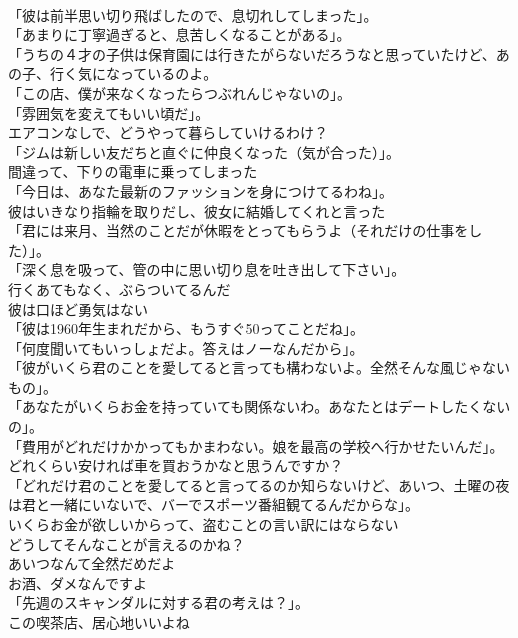 \documentclass[8pt]{extreport}
\begin{document}
\begin{CJK}{UTF8}{min}
\\	「彼は前半思い切り飛ばしたので、息切れしてしまった」。	
\\	「あまりに丁寧過ぎると、息苦しくなることがある」。	
\\	「うちの４才の子供は保育園には行きたがらないだろうなと思っていたけど、あの子、行く気になっているのよ。
\\	「この店、僕が来なくなったらつぶれんじゃないの」。	
\\	「雰囲気を変えてもいい頃だ」。	
\\	エアコンなしで、どうやって暮らしていけるわけ？	
\\	「ジムは新しい友だちと直ぐに仲良くなった（気が合った）」。	
\\	間違って、下りの電車に乗ってしまった	
\\	「今日は、あなた最新のファッションを身につけてるわね」。	
\\	彼はいきなり指輪を取りだし、彼女に結婚してくれと言った	
\\	「君には来月、当然のことだが休暇をとってもらうよ（それだけの仕事をした）」。	
\\	「深く息を吸って、管の中に思い切り息を吐き出して下さい」。	
\\	行くあてもなく、ぶらついてるんだ	
\\	彼は口ほど勇気はない	
\\	「彼は1960年生まれだから、もうすぐ50ってことだね」。	
\\	「何度聞いてもいっしょだよ。答えはノーなんだから」。	
\\	「彼がいくら君のことを愛してると言っても構わないよ。全然そんな風じゃないもの」。	
\\	「あなたがいくらお金を持っていても関係ないわ。あなたとはデートしたくないの」。	
\\	「費用がどれだけかかってもかまわない。娘を最高の学校へ行かせたいんだ」。	
\\	どれくらい安ければ車を買おうかなと思うんですか？	
\\	「どれだけ君のことを愛してると言ってるのか知らないけど、あいつ、土曜の夜は君と一緒にいないで、バーでスポーツ番組観てるんだからな」。	
\\	いくらお金が欲しいからって、盗むことの言い訳にはならない	
\\	どうしてそんなことが言えるのかね？	
\\	あいつなんて全然だめだよ	
\\	お酒、ダメなんですよ	
\\	「先週のスキャンダルに対する君の考えは？」。	
\\	この喫茶店、居心地いいよね	

\end{CJK}
\end{document}
